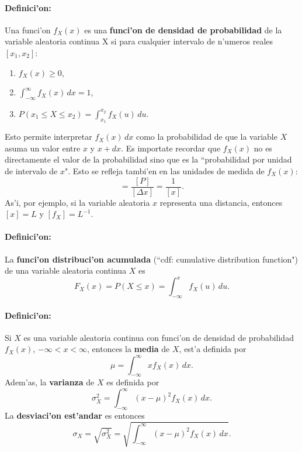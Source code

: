 \documentclass[a4paper]{report}
\begin{document}
\paragraph{Definici'on:} Una funci'on $f_X(x)$ es una \textbf{funci'on de densidad de probabilidad} de la variable aleatoria continua X si para cualquier intervalo de n'umeros reales $[x_1,x_2]$:
\begin{enumerate}
\item $f_X(x)\geq 0$,
\item $\int_{-\infty}^\infty f_X(x)\,dx=1$,
\item $P(x_1\le X\le x_2)=\int_{x_1}^{x_2}f_X(u)\,du$.
\end{enumerate}

Esto permite interpretar $f_X(x)\,dx$ como la probabilidad de que la variable $X$ asuma un valor entre $x$ y $x+dx$. Es importate recordar que $f_X(x)$ no es directamente el valor de la probabilidad sino que es la ``probabilidad por unidad de intervalo de $x$". Esto se refleja tambi'en en las unidades de medida de $f_X(x)$:
\begin{equation}
[f_X]=\frac{[P]}{[\Delta x]}=\frac{1}{[x]}.
\end{equation}
As'i, por ejemplo, si la variable aleatoria $x$ representa una distancia, entonces $[x]=L$ y $[f_X]=L^{-1}$.


\paragraph{Definici'on:} La \textbf{funci'on distribuci'on acumulada} (``cdf: cumulative distribution function") de una variable aleatoria continua $X$ es
\begin{equation}
F_X(x)=P(X\le x)=\int_{-\infty}^x f_X(u)\,du.
\end{equation}



\paragraph{Definici'on:} Si $X$ es una variable aleatoria continua con funci'on de densidad de probabilidad $f_X(x)$, $-\infty<x<\infty$, entonces la \textbf{media} de $X$, est'a definida por
\begin{equation}
\mu=\int_{-\infty}^\infty xf_X(x)\,dx.
\end{equation}
Adem'as, la \textbf{varianza} de $X$ es definida por 
\begin{equation}
\sigma_X^2=\int_{-\infty}^\infty (x-\mu)^2f_X(x)\,dx.
\end{equation}
La \textbf{desviaci'on est'andar} es entonces
\begin{equation}
\sigma_X=\sqrt{\sigma_X^2}=\sqrt{\int_{-\infty}^\infty (x-\mu)^2f_X(x)\,dx}.
\end{equation}
\end{document}
